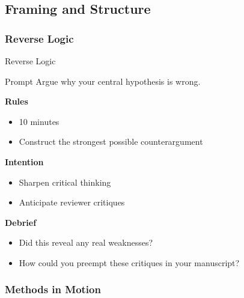 \documentclass{beamer}
\begin{document}
\subsection{Framing and Structure}

\subsubsection{Reverse Logic}

\begin{frame}{Reverse Logic}
\begin{block}{Prompt}
Argue why your central hypothesis is wrong.
\end{block}

\vspace{0.8em}
\textbf{Rules}
\begin{itemize}
    \item 10 minutes
    \item Construct the strongest possible counterargument
\end{itemize}

\textbf{Intention}
\begin{itemize}
    \item Sharpen critical thinking
    \item Anticipate reviewer critiques
\end{itemize}

\textbf{Debrief}
\begin{itemize}
    \item Did this reveal any real weaknesses?
    \item How could you preempt these critiques in your manuscript?
\end{itemize}
\end{frame}

\subsubsection{Methods in Motion}
\end{document}
